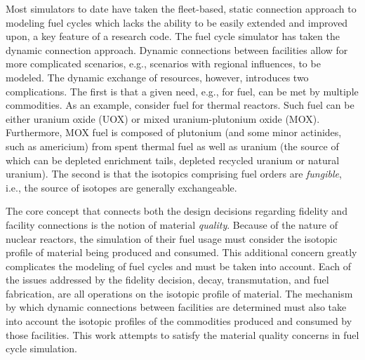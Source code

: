 Most simulators to date have taken the fleet-based, static connection approach
to modeling fuel cycles which lacks the ability to be easily extended and
improved upon, a key feature of a research code. The \Cyclus fuel cycle
simulator has taken the dynamic connection approach. Dynamic connections between
facilities allow for more complicated scenarios, e.g., scenarios with regional
influences, to be modeled. The dynamic exchange of resources, however,
introduces two complications. The first is that a given need, e.g., for fuel,
can be met by multiple commodities. As an example, consider fuel for thermal
reactors. Such fuel can be either uranium oxide (UOX) or mixed uranium-plutonium
oxide (MOX). Furthermore, MOX fuel is composed of plutonium (and some minor
actinides, such as americium) from spent thermal fuel as well as uranium (the
source of which can be depleted enrichment tails, depleted recycled uranium or
natural uranium). The second is that the isotopics comprising fuel orders
are \textit{fungible}, i.e., the source of isotopes are generally exchangeable. 

The core concept that connects both the design decisions regarding fidelity and
facility connections is the notion of material \textit{quality}. Because of the
nature of nuclear reactors, the simulation of their fuel usage must consider the
isotopic profile of material being produced and consumed. This additional
concern greatly complicates the modeling of fuel cycles and must be taken into
account. Each of the issues addressed by the fidelity decision, decay,
transmutation, and fuel fabrication, are all operations on the isotopic profile
of material. The mechanism by which dynamic connections between facilities are
determined must also take into account the isotopic profiles of the commodities
produced and consumed by those facilities. This work attempts to satisfy the
material quality concerns in fuel cycle simulation.

